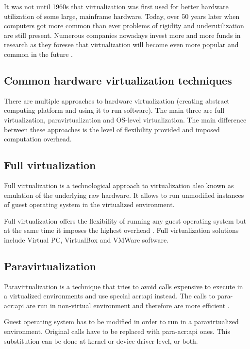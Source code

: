 \documentclass[11pt,openany]{book}
\begin{document}
        It was not until 1960s that virtualization was first used for better hardware utilization of some large,
        mainframe hardware. Today, over 50 years later when computers got more common than ever problems of rigidity and
        underutilization are still present. Numerous companies nowadays invest more and more funds in research as they
        foresee that virtualization will become even more popular and common in the future \cite{virtualization}.


      \subsection{Common hardware virtualization techniques}

        There are multiple approaches to hardware virtualization (creating abstract computing platform \cite{turban} and
        using it to run software). The main three are full virtualization, paravirtualization and OS-level
        virtualization. The main difference between these approaches is the level of flexibility provided and imposed
        computation overhead.


      \subsection{Full virtualization}

        Full virtualization is a technological approach to virtualization also known as emulation of the underlying raw
        hardware. It allows to run unmodified instances of guest operating system in the virtualized environment. 

        Full virtualization offers the flexibility of running any guest operating system but at the same time it imposes
        the highest overhead \cite{turban}. Full virtualization solutions include Virtual PC, VirtualBox and VMWare
        software.


      \subsection{Paravirtualization}

        Paravirtualization is a technique that tries to avoid calls expensive to execute in a virtualized environments
        and use special \gls{acr:api} instead. The calls to para-\gls{acr:api} are run in non-virtual environment and
        therefore are more efficient \cite{crosby}.

        Guest operating system has to be modified in order to run in a paravirtualized environment. Original calls have
        to be replaced with para-\gls{acr:api} ones. This substitution can be done at kernel or device driver level, or
        both.
\end{document}
